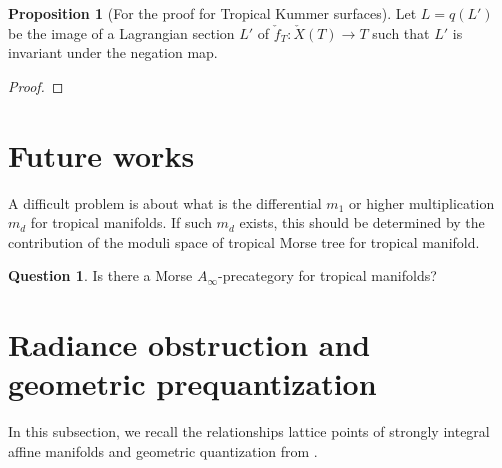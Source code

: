 \documentclass[a4paper,dvipdfmx,reqno,12pt]{amsart}
\theoremstyle{definition}
\newtheorem{proposition}[theorem]{Proposition}
\newtheorem{question}[theorem]{Question}
\numberwithin{equation}{section}
\begin{document}
\begin{proposition}[{For the proof for Tropical Kummer surfaces}]
Let $L=q(L')$ be the image of a Lagrangian 
section $L'$ of $\check{f}_{T}\colon \check{X}(T)\to T$ such 
that $L'$ is invariant under the negation map. 
\end{proposition}
\begin{proof}

\end{proof}


\section{Future works}

A difficult problem is about what is the differential $m_1$ or higher multiplication $m_d$ for tropical manifolds.
If such $m_d$ exists, this should be determined by the contribution of the moduli space of tropical Morse tree for tropical manifold.
\begin{question}
  Is there a Morse $A_{\infty}$-precategory for tropical manifolds?
\end{question}







\appendix

\section{Radiance obstruction and geometric prequantization}
\label{sec: BSRR}
\label{appendix-geometric-quantization}

In this subsection, we recall the relationships lattice points of 
strongly integral affine manifolds and geometric quantization 
from \cite{1999math......2027T,MR3525095}.
\end{document}
